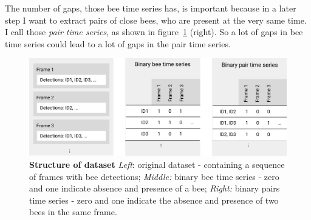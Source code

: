 The number of gaps, those bee time series has, is important because in a later step I want to extract pairs of close bees, who are present at the very same time. I call those \emph{pair time series}, as shown in figure~\ref{fig:structure} (right). So a lot of gaps in bee time series could lead to a lot of gaps in the pair time series.

\begin{figure}[htb]
	\centering
	\includegraphics[width=1.0\textwidth]{Figures/structure}
	\caption[Structure of dataset]{\textbf{Structure of dataset} \emph{Left}: original dataset - containing a sequence of frames with bee detections; \emph{Middle:} binary bee time series - zero and one indicate absence and presence of a bee; \emph{Right:} binary pairs time series - zero and one indicate the absence and presence of two bees in the same frame.}
	\label{fig:structure}
\end{figure}

